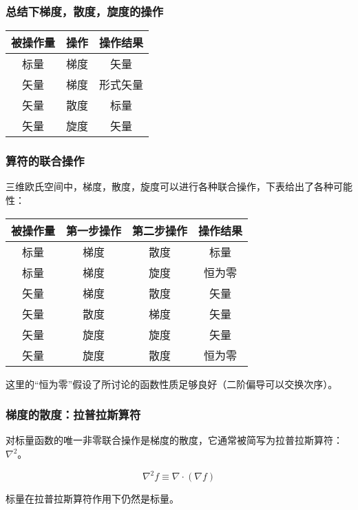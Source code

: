 \documentclass[CJK]{beamer}
\begin{document}
\begin{frame}
  \frametitle{总结下梯度，散度，旋度的操作}

\begin{center}
  \begin{tabular}{c|c|c}
    \hline
    \hline
    被操作量 & 操作 & 操作结果 \\
    \hline
    标量  & 梯度 & 矢量 \\
    矢量 & 梯度 & 形式矢量 \\
    矢量 & 散度 & 标量 \\
    矢量 & 旋度 & 矢量 \\
    \hline
  \end{tabular}
\end{center}
  
\end{frame}


\begin{frame}
  \frametitle{算符的联合操作}
  三维欧氏空间中，梯度，散度，旋度可以进行各种联合操作，下表给出了各种可能性：

  \begin{center}
  \begin{tabular}{c|c|c|c}
    \hline
    \hline
    被操作量 & 第一步操作 & 第二步操作& 操作结果 \\
    \hline
    标量  & 梯度 & 散度 & 标量 \\
    标量 & 梯度  & 旋度 & 恒为零 \\
    矢量 & 梯度 & 散度 & 矢量 \\    
    矢量 & 散度 & 梯度 & 矢量 \\    
    矢量 & 旋度 & 旋度 & 矢量 \\
    矢量 & 旋度 & 散度 & 恒为零 \\    
    \hline
  \end{tabular}

  这里的“恒为零”假设了所讨论的函数性质足够良好（二阶偏导可以交换次序）。
\end{center}
  
\end{frame}


\begin{frame}
  \frametitle{梯度的散度：拉普拉斯算符}

  对标量函数的唯一非零联合操作是梯度的散度，它通常被简写为拉普拉斯算符：$\nabla^2$。

  $$\nabla^2 f \equiv \nabla \cdot(\nabla f)$$

  标量在拉普拉斯算符作用下仍然是标量。
\end{frame}
\end{document}
